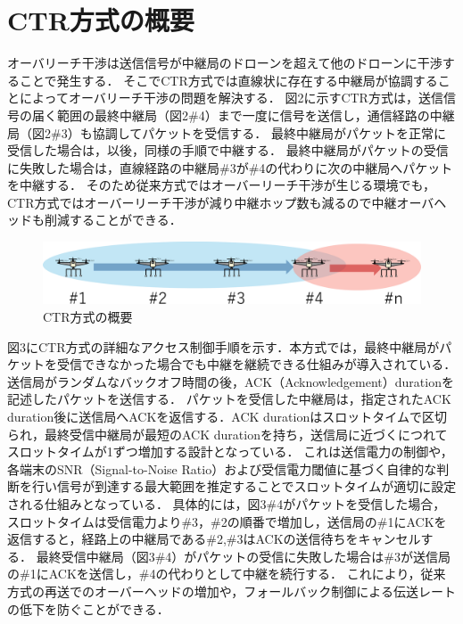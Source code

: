 \documentclass[a4paper,10pt]{ltjsarticle}
\begin{document}
\section{CTR方式の概要}
オーバリーチ干渉は送信信号が中継局のドローンを超えて他のドローンに干渉することで発生する．
そこでCTR方式では直線状に存在する中継局が協調することによってオーバリーチ干渉の問題を解決する．
図2に示すCTR方式は，送信信号の届く範囲の最終中継局（図2\#4）まで一度に信号を送信し，通信経路の中継局（図2\#3）も協調してパケットを受信する．
最終中継局がパケットを正常に受信した場合は，以後，同様の手順で中継する．
最終中継局がパケットの受信に失敗した場合は，直線経路の中継局\#3が\#4の代わりに次の中継局へパケットを中継する．
そのため従来方式ではオーバーリーチ干渉が生じる環境でも，CTR方式ではオーバーリーチ干渉が減り中継ホップ数も減るので中継オーバヘッドも削減することができる．
\begin{figure}[H]
  \centering
  \includegraphics[width=\linewidth]{CTR_topology.pdf} 
  \caption{CTR方式の概要}

\end{figure}
図3にCTR方式の詳細なアクセス制御手順を示す．本方式では，最終中継局がパケットを受信できなかった場合でも中継を継続できる仕組みが導入されている．
送信局がランダムなバックオフ時間の後，ACK（Acknowledgement）durationを記述したパケットを送信する．
パケットを受信した中継局は，指定されたACK duration後に送信局へACKを返信する．ACK durationはスロットタイムで区切られ，最終受信中継局が最短のACK durationを持ち，送信局に近づくにつれてスロットタイムが1ずつ増加する設計となっている．
これは送信電力の制御や，各端末のSNR（Signal-to-Noise Ratio）および受信電力閾値に基づく自律的な判断を行い信号が到達する最大範囲を推定することでスロットタイムが適切に設定される仕組みとなっている．
具体的には，図3\#4がパケットを受信した場合，スロットタイムは受信電力より\#3，\#2の順番で増加し，送信局の\#1にACKを返信すると，経路上の中継局である\#2,\#3はACKの送信待ちをキャンセルする．
最終受信中継局（図3\#4）がパケットの受信に失敗した場合は\#3が送信局の\#1にACKを送信し，\#4の代わりとして中継を続行する．
これにより，従来方式の再送でのオーバーヘッドの増加や，フォールバック制御による伝送レートの低下を防ぐことができる．
\end{document}
